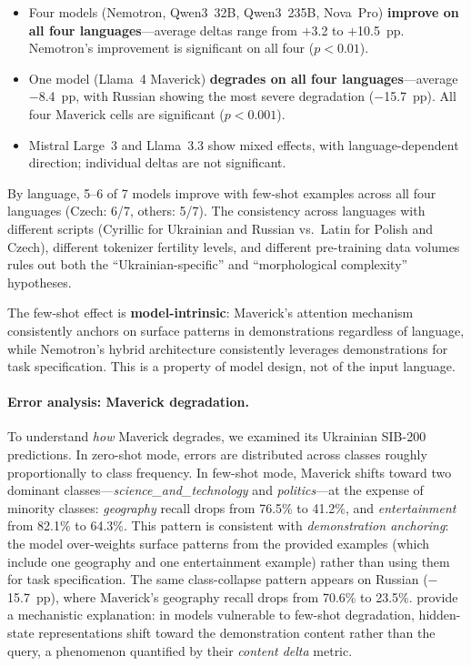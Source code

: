 \documentclass[11pt,a4paper]{article}
\begin{document}
\begin{itemize}[leftmargin=*]
    \item Four models (Nemotron, Qwen3~32B, Qwen3~235B, Nova~Pro) \textbf{improve on all four languages}---average deltas range from $+$3.2 to $+$10.5~pp. Nemotron's improvement is significant on all four ($p < 0.01$).
    \item One model (Llama~4 Maverick) \textbf{degrades on all four languages}---average $-$8.4~pp, with Russian showing the most severe degradation ($-$15.7~pp). All four Maverick cells are significant ($p < 0.001$).
    \item Mistral Large~3 and Llama~3.3 show mixed effects, with language-dependent direction; individual deltas are not significant.
\end{itemize}

By language, 5--6 of 7 models improve with few-shot examples across all four languages (Czech: 6/7, others: 5/7). The consistency across languages with different scripts (Cyrillic for Ukrainian and Russian vs.\ Latin for Polish and Czech), different tokenizer fertility levels, and different pre-training data volumes rules out both the ``Ukrainian-specific'' and ``morphological complexity'' hypotheses.

The few-shot effect is \textbf{model-intrinsic}: Maverick's attention mechanism consistently anchors on surface patterns in demonstrations regardless of language, while Nemotron's hybrid architecture consistently leverages demonstrations for task specification. This is a property of model design, not of the input language.

\paragraph{Error analysis: Maverick degradation.} To understand \emph{how} Maverick degrades, we examined its Ukrainian SIB-200 predictions. In zero-shot mode, errors are distributed across classes roughly proportionally to class frequency. In few-shot mode, Maverick shifts toward two dominant classes---\emph{science\_and\_technology} and \emph{politics}---at the expense of minority classes: \emph{geography} recall drops from 76.5\% to 41.2\%, and \emph{entertainment} from 82.1\% to 64.3\%. This pattern is consistent with \emph{demonstration anchoring}: the model over-weights surface patterns from the provided examples (which include one geography and one entertainment example) rather than using them for task specification. The same class-collapse pattern appears on Russian ($-$15.7~pp), where Maverick's geography recall drops from 70.6\% to 23.5\%. \citet{ovcharov2026fewshot} provide a mechanistic explanation: in models vulnerable to few-shot degradation, hidden-state representations shift toward the demonstration content rather than the query, a phenomenon quantified by their \emph{content delta} metric.
\end{document}

